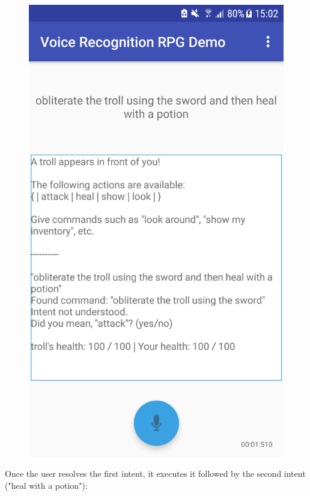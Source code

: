 \documentclass[12pt]{article}
\begin{document}
\begin{center}
\begin{figure}[H]
\begin{center}
  \includegraphics[scale=0.25]{Screenshot_20180527-150212.png}
  \label{fig:snapshot-multiple-command-1}
  \end{center}
\end{figure}
\end{center}

\newpage
Once the user resolves the first intent, it executes it followed by the second intent ("heal with a potion"):
\end{document}
